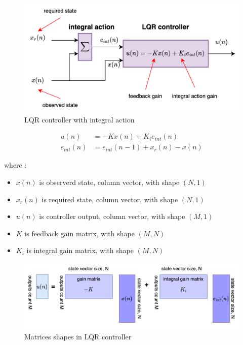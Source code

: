 \documentclass[12pt,twoside,onecolumn,openany,extrafontsizes,dvipsnames]{memoir}
\begin{document}
        \begin{figure}[!htb]
            \centering
            \includegraphics[scale=0.8]{../diagrams/control_generic/control_generic-lqr_discrete.png}
            \caption{LQR controller with integral action}
            \label{fig:control_lqr_generic}
        \end{figure}

        \begin{align}
            u(n)&= -Kx(n) + K_ie_{int}(n) \\
            e_{int}(n)& = e_{int}(n-1) + x_r(n) - x(n)
        \end{align}

        where : 
        \begin{itemize}
            \item $x(n)$ is observerd state, column vector, with shape $(N, 1)$
            \item $x_r(n)$ is required state, column vector, with shape $(N, 1)$
            \item $u(n)$ is controller output, column vector, with shape $(M, 1)$
            \item $K$ is feedback gain matrix, with shape $(M, N)$
            \item $K_i$ is integral gain matrix, with shape $(M, N)$ 
        \end{itemize}


        \begin{figure}[!htb]
            \centering
            \includegraphics[scale=0.8]{../diagrams/control_generic/control_generic-lqr_detail.png}
            \caption{Matrices shapes in LQR controller}
            \label{fig:control_lqr_matrices_shape}
        \end{figure}
        
\end{document}
